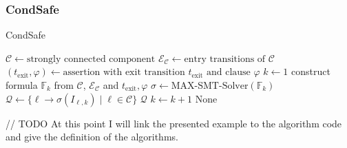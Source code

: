 \documentclass[12pt]{scrartcl}
\begin{document}
\subsubsection{CondSafe}

\begin{algorithm}
\caption{CondSafe}\label{condsafe}
\begin{algorithmic}[1]
\State $\mathcal{C} \gets \text{strongly connected component}$
\State $\mathcal{E}_\mathcal{C} \gets \text{entry transitions of } \mathcal{C}$
\State $(t_\text{exit}, \varphi) \gets \text{assertion with exit transition } t_\text{exit} \text{ and clause } \varphi$
\State $k \gets 1$
\Repeat
  \State construct formula $\mathbb{F}_k$ from $\mathcal{C}$, $\mathcal{E}_\mathcal{C}$ and $t_\text{exit}, \varphi$
  \State $\sigma \gets \text{MAX-SMT-Solver}(\mathbb{F}_k)$
    \State $\mathcal{Q} \gets \lbrace \ell \rightarrow \sigma(I_{\ell, k}) \mid \ell \in \mathcal{C} \rbrace$
    \Return $\mathcal{Q}$
  \EndIf
  \State $k \gets k + 1$
\Return None
\end{algorithmic}
\end{algorithm}

// TODO At this point I will link the presented example to the algorithm code and give the definition of the algorithms.
\end{document}
